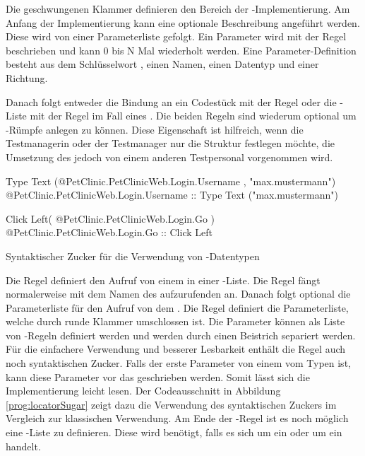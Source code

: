 \SuperPar
Die geschwungenen Klammer definieren den Bereich der -Implementierung. Am Anfang der Implementierung kann eine optionale Beschreibung angeführt werden. Diese wird von einer Parameterliste gefolgt. Ein Parameter wird mit der Regel  beschrieben und kann 0 bis N Mal wiederholt werden. Eine Parameter-Definition besteht aus dem Schlüsselwort , einen Namen, einen Datentyp und einer Richtung.

\SuperPar
Danach folgt entweder die Bindung an ein Codestück mit der Regel  oder die -Liste mit der Regel  im Fall eines . Die beiden Regeln sind wiederum optional um -Rümpfe anlegen zu können. Diese Eigenschaft ist hilfreich, wenn die Testmanagerin oder der Testmanager nur die Struktur festlegen möchte, die Umsetzung des  jedoch von einem anderen Testpersonal vorgenommen wird. 

\begin{program}
\begin{JavaCode}
  Type Text (@PetClinic.PetClinicWeb.Login.Username , "max.mustermann")
	@PetClinic.PetClinicWeb.Login.Username :: Type Text ("max.mustermann")
	
	
	Click Left( @PetClinic.PetClinicWeb.Login.Go )
  @PetClinic.PetClinicWeb.Login.Go :: Click Left
\end{JavaCode}
\caption{Syntaktischer Zucker für die Verwendung von -Datentypen}
\label{prog:locatorSugar}
\end{program}

\SuperPar
Die Regel  definiert den Aufruf von einem  in einer -Liste. Die Regel fängt normalerweise mit dem Namen des aufzurufenden  an. Danach folgt optional die Parameterliste für den Aufruf von dem . Die Regel  definiert die Parameterliste, welche durch runde Klammer umschlossen ist. Die Parameter können als Liste von -Regeln definiert werden und werden durch einen Beistrich separiert werden. Für die einfachere Verwendung und besserer Lesbarkeit enthält die Regel  auch noch syntaktischen Zucker. Falls der erste Parameter von einem  vom Typen  ist, kann diese Parameter vor das  geschrieben werden. Somit lässt sich die Implementierung leicht lesen. Der Codeausschnitt in Abbildung \ref{prog:locatorSugar} zeigt dazu die Verwendung des syntaktischen Zuckers im Vergleich zur klassischen Verwendung. Am Ende der -Regel ist es noch möglich eine -Liste zu definieren. Diese wird benötigt, falls es sich um ein  oder um ein  handelt.

